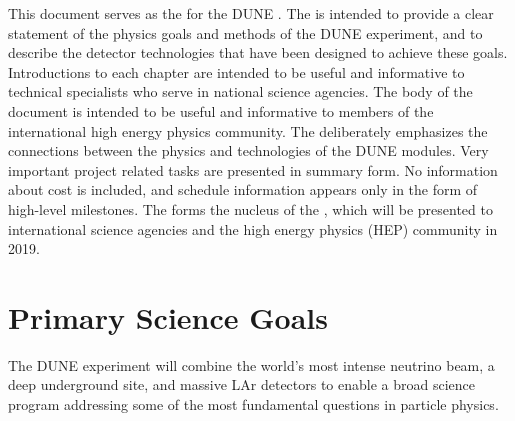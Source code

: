 This document serves as the  for the DUNE .  The   is intended to provide a clear statement of the physics goals and methods of the DUNE experiment, and to describe the detector technologies that have been designed to achieve these goals. Introductions to each chapter are intended to be useful and informative to technical specialists who serve in national science agencies. The body of the document is intended to be useful and informative to members of the international high energy physics community.  The  deliberately emphasizes the connections between the physics and technologies of the DUNE  modules. Very important project related tasks are presented in summary form. No information about cost is included, and schedule information appears only in the form of high-level milestones. The  forms the nucleus of the , which will be presented to international science  agencies and the high energy physics (HEP) community in 2019.


%

\section{Primary Science Goals} %


The DUNE experiment will combine the world's most intense neutrino beam, a deep underground site, and massive LAr detectors to enable a broad science program addressing some of the most fundamental questions in particle physics. 


